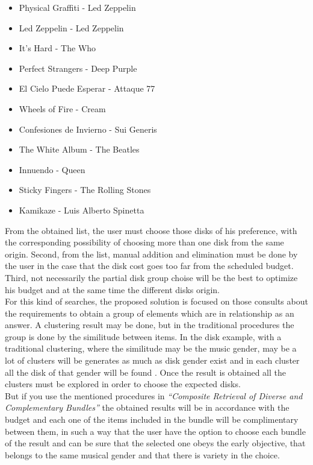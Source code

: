 \begin{itemize}
  \item Physical Graffiti - Led Zeppelin
  \item Led Zeppelin - Led Zeppelin
  \item It's Hard - The Who
  \item Perfect Strangers - Deep Purple
  \item El Cielo Puede Esperar - Attaque 77
  \item Wheels of Fire - Cream
  \item Confesiones de Invierno - Sui Generis
  \item The White Album - The Beatles
  \item Innuendo - Queen
  \item Sticky Fingers - The Rolling Stones
  \item Kamikaze - Luis Alberto Spinetta
\end{itemize}
From the obtained list, the user  must choose those disks of his preference, with the corresponding possibility of choosing more than one disk from the same origin.  Second, from the list, manual addition and elimination  must be done by the user in the case that the disk cost goes too far from the scheduled  budget. Third, not necessarily the partial disk  group choise will be  the best  to optimize his budget and at the same time the different disks origin.\\
For this kind of searches, the proposed solution is focused on those consults  about the  requirements  to obtain a group of elements which are in relationship as an answer. A clustering result may be done, but in the traditional procedures the group is done by the similitude between items. In the disk example, with a traditional clustering, where the similitude may be the music gender, may be a lot of clusters will be generates as much as disk gender exist and in each cluster all the disk of that gender will be found .  Once the result is obtained all the clusters must be explored in order to choose the expected disks.\\
But if you use the mentioned procedures in \textit{``Composite Retrieval of Diverse and Complementary Bundles''} the obtained results will be in accordance with the budget and each one of the items included in the bundle will be complimentary between them, in such a way that the user  have the option to choose each bundle of the result and can be sure that the selected one obeys the early objective, that belongs to the same musical gender and that there is variety in the choice.\\
